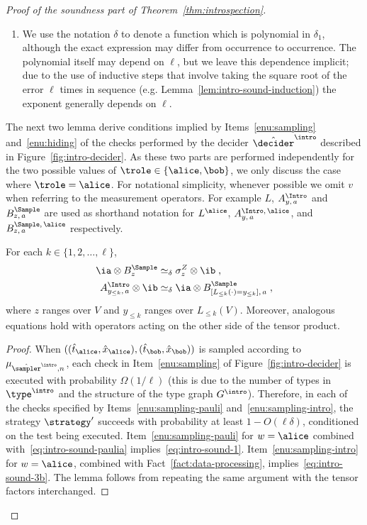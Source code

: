 \begin{proof}[Proof of the soundness part of Theorem~\ref{thm:introspection}]
\begin{enumerate}
  \item We use the notation $\delta$ to denote a function which is polynomial in
    $\delta_1$, although the exact expression may differ from occurrence to
    occurrence.
    The polynomial itself may depend on $\ell$, but we leave this dependence
    implicit; due to the use of inductive steps that involve taking the square
    root of the error $\ell$ times in sequence (e.g.
    Lemma~\ref{lem:intro-sound-induction}) the exponent generally depends on
    $\ell$.
  \end{enumerate}

  The next two lemma derive conditions implied by Items~\ref{enu:sampling}
  and~\ref{enu:hiding} of the checks performed by the decider $\tdint$
  described in Figure~\ref{fig:intro-decider}.
  As these two parts are performed independently for the two possible values of
  $\trole\in\{\alice,\bob\}$, we only discuss the case where $\trole = \alice$.
  For notational simplicity, whenever possible we omit $v$ when referring to the
  measurement operators.
  For example $L$, $\ai$ and $\bs$ are used as shorthand notation
  for $L^\alice$, $A^{\Intro,\, \alice}_{y,\, a}$, and $B^{\Sample,\,
    \alice}_{z,\, a}$ respectively.

  \begin{lemma}
    \label{lem:intro-sound-1}
    For each $k\in\{ 1, 2, \ldots, \ell\}$,
    \begin{align}
      \ia \otimes \bs[z]
      & \simeq_\delta \sigma^Z_z \otimes \ib\;,
        \label{eq:intro-sound-1} \\
      \ai[y_{\leq k},\, a] \otimes \ib
      & \simeq_\delta \ia \otimes \bs[\Llek,\, a]\;,
        \label{eq:intro-sound-3b}
    \end{align}
    where $z$ ranges over $V$ and $y_{\leq k}$ ranges over $L_{\leq k}(V)$.
    Moreover, analogous equations hold with operators acting on the other side
    of the tensor product.
  \end{lemma}
	
  \begin{proof}
    When $((\hat{t}_\alice,\hat{x}_\alice),(\hat{t}_\bob,\hat{x}_\bob))$ is
    sampled according to $\mu_{\tsint,n}$, each check in
    Item~\ref{enu:sampling} of Figure~\ref{fig:intro-decider} is executed with
    probability $\Omega(1/\ell)$ (this is due to the number of types in
    $\type^\intro$ and the structure of the type graph $G^\intro$).
    Therefore, in each of the checks specified by Items~\ref{enu:sampling-pauli}
    and~\ref{enu:sampling-intro}, the strategy $\strategy'$ succeeds with
    probability at least $1 - O(\ell \delta)$, conditioned on the test being
    executed.
    Item~\ref{enu:sampling-pauli} for $w=\alice$ combined
    with~\eqref{eq:intro-sound-paulia} implies~\eqref{eq:intro-sound-1}.
    Item~\ref{enu:sampling-intro} for $w=\alice$, combined with
    Fact~\ref{fact:data-processing}, implies~\eqref{eq:intro-sound-3b}.
    The lemma follows from repeating the same argument with the tensor factors
    interchanged.
  \end{proof}


\end{proof}

